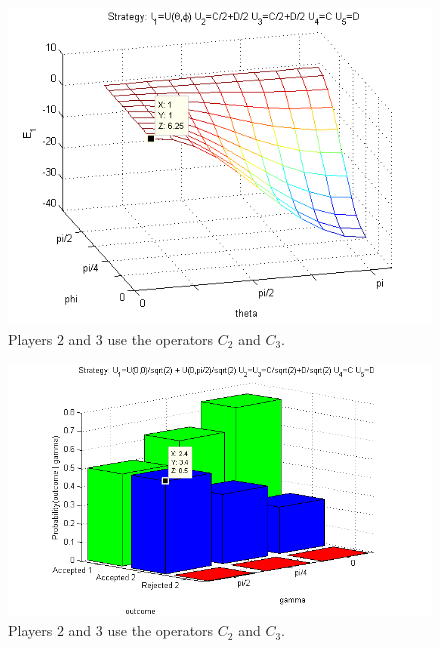 \begin{figure}[h]
\centering 
\includegraphics[scale=0.80]{Figures/1.5qubit/mixedclassical.png}
\caption{Players $2$ and $3$ use the operators $C_{2}$ and $C_{3}$. }
\label{fig:pg_3players_99_0_1:2}
\end{figure}

\begin{figure}[h]
\centering 
\includegraphics[scale=0.80]{Figures/1.5qubit/mixedmixedclassical.png}
\caption{Players $2$ and $3$ use the operators $C_{2}$ and $C_{3}$. }
\label{fig:pg_3players_99_0_1:2}
\end{figure}




